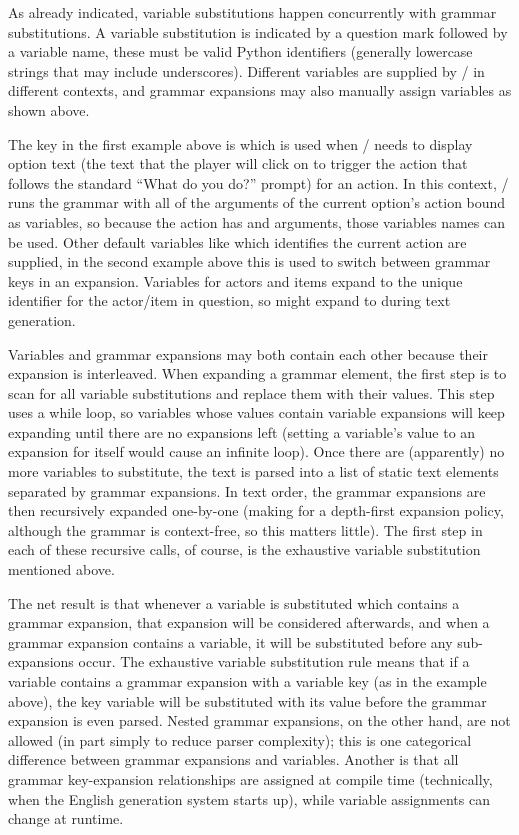 As already indicated, variable substitutions happen concurrently with grammar substitutions.
%
A variable substitution is indicated by a question mark followed by a variable name, these must be valid Python identifiers (generally lowercase strings that may include underscores).
%
Different variables are supplied by \dunyazad/ in different contexts, and grammar expansions may also manually assign variables as shown above.


The key in the first example above is  which is used when \dunyazad/ needs to display option text (the text that the player will click on to trigger the action that follows the standard ``What do you do?'' prompt) for an  action.
%
In this context, \dunyazad/ runs the grammar with all of the arguments of the current option's action bound as variables, so because the  action has  and  arguments, those variables names can be used.
%
Other default variables like  which identifies the current action are supplied, in the second example above this is used to switch between grammar keys in an expansion.
%
Variables for actors and items expand to the unique identifier for the actor/item in question, so  might expand to  during text generation.


Variables and grammar expansions may both contain each other because their expansion is interleaved.
%
When expanding a grammar element, the first step is to scan for all variable substitutions and replace them with their values.
%
This step uses a while loop, so variables whose values contain variable expansions will keep expanding until there are no expansions left (setting a variable's value to an expansion for itself would cause an infinite loop).
%
Once there are (apparently) no more variables to substitute, the text is parsed into a list of static text elements separated by grammar expansions.
%
In text order, the grammar expansions are then recursively expanded one-by-one (making for a depth-first expansion policy, although the grammar is context-free, so this matters little).
%
The first step in each of these recursive calls, of course, is the exhaustive variable substitution mentioned above.


The net result is that whenever a variable is substituted which contains a grammar expansion, that expansion will be considered afterwards, and when a grammar expansion contains a variable, it will be substituted before any sub-expansions occur.
%
The exhaustive variable substitution rule means that if a variable contains a grammar expansion with a variable key (as in the example above), the key variable will be substituted with its value before the grammar expansion is even parsed.
%
Nested grammar expansions, on the other hand, are not allowed (in part simply to reduce parser complexity); this is one categorical difference between grammar expansions and variables.
%
Another is that all grammar key-expansion relationships are assigned at compile time (technically, when the English generation system starts up), while variable assignments can change at runtime.


